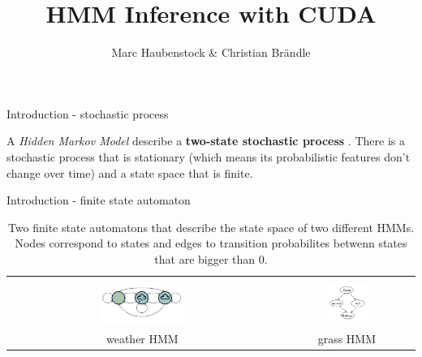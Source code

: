 \documentclass[11pt]{beamer}
\begin{document}
\begin{frame}
\title{HMM Inference with CUDA}
\subtitle{Marc Haubenstock \& Christian Brändle}

\titlepage
\end{frame}


\begin{frame}{Introduction - stochastic process}

A \emph{Hidden Markov Model} describe a \textbf{two-state stochastic process} .
There is a stochastic process that is stationary (which means its probabilistic features don't change over time) and a state space that is finite.

\end{frame}

\begin{frame}{Introduction - finite state automaton}
\begin{table}[h]
	\begin{center}
		\begin{tabular}{| c | c |}
			\hline
			& \\
			\includegraphics[width=0.33\textwidth]{./Images/FiniteStateAutomaton_1.png} & \includegraphics[width=0.33\textwidth]{./Images/FiniteStateAutomaton_2.png} \\
			\hline
			weather HMM \footfullcite{hmm_fb} & grass HMM \footfullcite{gm_bn} \\
			\hline
		\end{tabular}
	\end{center}
	\caption{Two finite state automatons that describe the state space of two different HMMs. Nodes correspond to states and edges to transition probabilites betwenn states that are bigger than $0$.}
	\label{tab:FiniteSA}
\end{table}


\end{frame}
\end{document}
